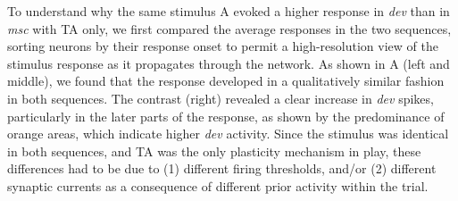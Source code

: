 \documentclass[9pt,lineno,onehalfspacing]{elife}
\newcommand{\dev}{\textit{dev}}
\newcommand{\msc}{\textit{msc}}
\begin{document}
To understand why the same stimulus A evoked a higher response in \dev{} than in \msc{} with TA only, we first compared the average responses in the two sequences, sorting neurons by their response onset to permit a high-resolution view of the stimulus response as it propagates through the network. As shown in A (left and middle), we found that the response developed in a qualitatively similar fashion in both sequences. The contrast (right) revealed a clear increase in \dev{} spikes, particularly in the later parts of the response, as shown by the predominance of orange areas, which indicate higher \dev{} activity. Since the stimulus was identical in both sequences, and TA was the only plasticity mechanism in play, these differences had to be due to (1) different firing thresholds, and/or (2) different synaptic currents as a consequence of different prior activity within the trial.
\end{document}
